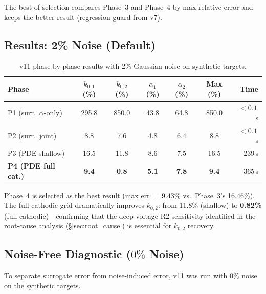 \documentclass[11pt]{article}
\begin{document}
The best-of selection compares Phase~3 and Phase~4 by max relative error and
keeps the better result (regression guard from v7).

\subsection{Results: 2\% Noise (Default)}

\begin{table}[htbp]
  \centering
  \caption{v11 phase-by-phase results with 2\% Gaussian noise on synthetic targets.}
  \label{tab:v11_noisy}
  \begin{tabular}{l S[round-precision=1] S[round-precision=1]
                    S[round-precision=1] S[round-precision=1]
                    S[round-precision=1] r}
    \toprule
    Phase & {$k_{0,1}$ (\%)} & {$k_{0,2}$ (\%)}
          & {$\alpha_1$ (\%)} & {$\alpha_2$ (\%)}
          & {Max (\%)} & {Time} \\
    \midrule
    P1 (surr.\ $\alpha$-only)   & 295.8 & 850.0 & 43.8 & 64.8 & 850.0 & $<0.1$\,s \\
    P2 (surr.\ joint)           &   8.8 &   7.6 &  4.8 &  6.4 &   8.8 & $<0.1$\,s \\
    P3 (PDE shallow)            &  16.5 &  11.8 &  8.6 &  7.5 &  16.5 & 239\,s    \\
    \textbf{P4 (PDE full cat.)} &\textbf{9.4} & \textbf{0.8} & \textbf{5.1} & \textbf{7.8}
                                &\textbf{9.4} & 365\,s    \\
    \bottomrule
  \end{tabular}
\end{table}

Phase~4 is selected as the best result (max err $= 9.43\%$ vs.\ Phase~3's
16.46\%).  The full cathodic grid dramatically improves $k_{0,2}$: from 11.8\%
(shallow) to \textbf{0.82\%} (full cathodic)---confirming that the deep-voltage
R2 sensitivity identified in the root-cause analysis
(\S\ref{sec:root_cause}) is essential for $k_{0,2}$ recovery.

\subsection{Noise-Free Diagnostic ($0\%$ Noise)}

To separate surrogate error from noise-induced error, v11 was run with
$0\%$ noise on the synthetic targets.
\end{document}
